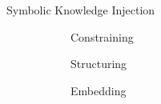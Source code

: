 \documentclass[presentation]{beamer}\mode<presentation>{\usetheme{AMSBolognaFC}}
\begin{document}
\begin{frame}{Symbolic Knowledge Injection}
    \centering

    \begin{figure}
        \begin{subfigure}{0.45\linewidth}\centering
            Constraining
        \end{subfigure}
        \hfill
        \begin{subfigure}{0.45\linewidth}\centering
            Structuring
        \end{subfigure}
        
        \bigskip
        
        \begin{subfigure}{0.45\linewidth}\centering
            Embedding
        \end{subfigure}
    \end{figure}
\end{frame}
\end{document}
